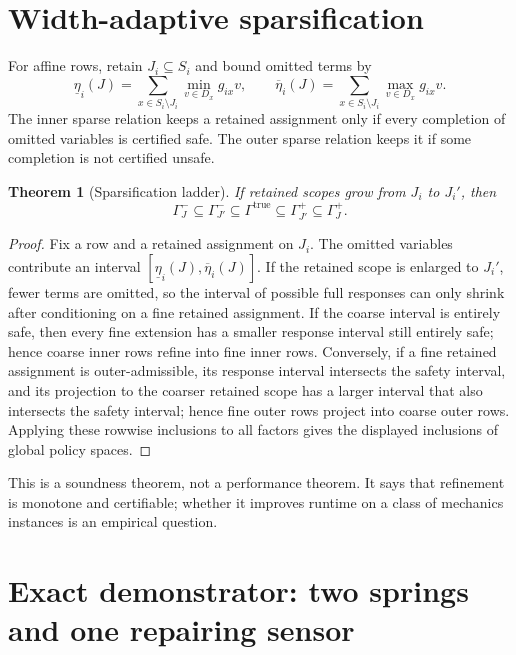 \documentclass[11pt]{article}
\theoremstyle{plain}
\newtheorem{theorem}{Theorem}[section]
\theoremstyle{definition}
\theoremstyle{remark}
\begin{document}
\section{Width-adaptive sparsification}
\label{sec:sparsification}

For affine rows, retain \(J_i\subseteq S_i\) and bound omitted terms by
\[
\underline\eta_i(J)=
\sum_{x\in S_i\setminus J_i}\min_{v\in D_x}g_{ix}v,
\qquad
\overline\eta_i(J)=
\sum_{x\in S_i\setminus J_i}\max_{v\in D_x}g_{ix}v.
\]
The inner sparse relation keeps a retained assignment only if every completion
of omitted variables is certified safe.  The outer sparse relation keeps it if
some completion is not certified unsafe.

\begin{theorem}[Sparsification ladder]
If retained scopes grow from \(J_i\) to \(J_i'\), then
\[
  \Gamma^-_J
  \subseteq
  \Gamma^-_{J'}
  \subseteq
  \Gamma^{\mathrm{true}}
  \subseteq
  \Gamma^+_{J'}
  \subseteq
  \Gamma^+_J.
\]
\end{theorem}

\begin{proof}
Fix a row and a retained assignment on \(J_i\).  The omitted variables contribute
an interval \([\underline\eta_i(J),\overline\eta_i(J)]\).  If the retained scope
is enlarged to \(J_i'\), fewer terms are omitted, so the interval of possible
full responses can only shrink after conditioning on a fine retained assignment.
If the coarse interval is entirely safe, then every fine extension has a smaller
response interval still entirely safe; hence coarse inner rows refine into fine
inner rows.  Conversely, if a fine retained assignment is outer-admissible, its
response interval intersects the safety interval, and its projection to the
coarser retained scope has a larger interval that also intersects the safety
interval; hence fine outer rows project into coarse outer rows.  Applying these
rowwise inclusions to all factors gives the displayed inclusions of global
policy spaces.
\end{proof}

This is a soundness theorem, not a performance theorem.  It says that refinement
is monotone and certifiable; whether it improves runtime on a class of mechanics
instances is an empirical question.

\section{Exact demonstrator: two springs and one repairing sensor}
\label{sec:two-spring}
\end{document}
